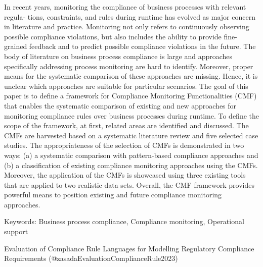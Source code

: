 \documentclass[
  letterpaper,
  DIV=11,
  numbers=noendperiod]{scrartcl}
\begin{document}
In recent years, monitoring the compliance of business processes with
relevant regula- tions, constraints, and rules during runtime has
evolved as major concern in literature and practice. Monitoring not only
refers to continuously observing possible compliance violations, but
also includes the ability to provide fine-grained feedback and to
predict possible compliance violations in the future. The body of
literature on business process compliance is large and approaches
specifically addressing process monitoring are hard to identify.
Moreover, proper means for the systematic comparison of these approaches
are missing. Hence, it is unclear which approaches are suitable for
particular scenarios. The goal of this paper is to define a framework
for Compliance Monitoring Functionalities (CMF) that enables the
systematic comparison of existing and new approaches for monitoring
compliance rules over business processes during runtime. To define the
scope of the framework, at first, related areas are identified and
discussed. The CMFs are harvested based on a systematic literature
review and five selected case studies. The appropriateness of the
selection of CMFs is demonstrated in two ways: (a) a systematic
comparison with pattern-based compliance approaches and (b) a
classification of existing compliance monitoring approaches using the
CMFs. Moreover, the application of the CMFs is showcased using three
existing tools that are applied to two realistic data sets. Overall, the
CMF framework provides powerful means to position existing and future
compliance monitoring approaches.

Keywords: Business process compliance, Compliance monitoring,
Operational support

Evaluation of Compliance Rule Languages for Modelling Regulatory
Compliance Requirements (@zasadaEvaluationComplianceRule2023)
\end{document}

